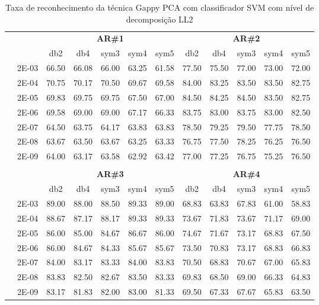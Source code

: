 \begin{table}[H]
	\centering
    \normalsize
	\caption{Taxa de reconhecimento da técnica Gappy PCA com classificador SVM com nível de decomposição LL2}
	\begin{tabular}{|c|c|c c c c c|c c c c c|}
\cline{3-12}
\multicolumn{2}{c|}{\multirow{2}{*}{}} & \multicolumn{5}{c|}{\textbf{AR\#1}}  & \multicolumn{5}{c|}{\textbf{AR\#2}} \\\cline{3-12}

\multicolumn{2}{c|}{}  & db2 & db4 & sym3 & sym4 & sym5 & db2 & db4& sym3 & sym4 & sym5 \\\hline
\multicolumn{1}{|c|}{ \multirow{6}{*}{\rotatebox[origin=c]{90}{\textbf{Gamma}}} }
&2E-03&	66.50&	66.08&	66.00&	63.25&	61.58&	77.50&	75.50&	77.00&	73.00&	72.00	\\\cline{2-12}
&2E-04&	70.75&	70.17&	70.50&	69.67&	69.58&	84.00&	83.25&	83.50&	83.50&	82.75	\\\cline{2-12}
&2E-05&	69.83&	69.75&	69.75&	67.50&	67.00&	84.50&	84.25&	84.50&	83.50&	82.75	\\\cline{2-12}
&2E-06&	69.58&	69.00&	69.00&	67.17&	66.33&	83.75&	83.00&	83.75&	83.00&	82.50	\\\cline{2-12}
&2E-07&	64.50&	63.75&	64.17&	63.83&	63.83&	78.50&	79.25&	79.50&	77.75&	78.50	\\\cline{2-12}
&2E-08&	63.67&	63.50&	63.67&	63.25&	63.33&	76.75&	77.50&	78.25&	76.25&	76.50	\\\cline{2-12}
&2E-09&	64.00&	63.17&	63.58&	62.92&	63.42&	77.00&	77.25&	76.75&	75.25&	76.50	
	
	


\\ \midrule
\multicolumn{12}{c}{}\\ 

\cline{3-12}
\multicolumn{2}{c}{} & \multicolumn{5}{|c|}{\textbf{AR\#3}}  & \multicolumn{5}{c|}{\textbf{AR\#4}} \\\cline{3-12}
\multicolumn{2}{c}{}  & \multicolumn{1}{|c}{db2} & db4 & sym3 & sym4 & sym5 & db2 & db4& sym3 & sym4 & sym5 \\\hline
\multicolumn{1}{|c|}{ \multirow{6}{*}{\rotatebox[origin=c]{90}{\textbf{Gamma}}} }
&2E-03&	89.00&	88.00&	88.50&	89.33&	89.00&	68.83&	63.83&	67.83&	61.00&	58.83	\\\cline{2-12}
&2E-04&	88.67&	87.17&	88.17&	89.33&	89.33&	73.67&	71.83&	73.67&	71.17&	69.00	\\\cline{2-12}
&2E-05&	86.00&	85.00&	84.67&	86.67&	86.00&	74.67&	71.67&	73.17&	68.83&	67.50	\\\cline{2-12}
&2E-06&	86.00&	84.67&	84.33&	85.67&	85.67&	73.50&	70.83&	73.17&	68.83&	66.83	\\\cline{2-12}
&2E-07&	84.00&	83.17&	83.33&	84.00&	83.83&	70.50&	68.83&	70.67&	67.00&	65.83	\\\cline{2-12}
&2E-08&	83.83&	82.50&	82.67&	83.50&	83.33&	69.83&	68.50&	69.00&	66.33&	64.83	\\\cline{2-12}
&2E-09&	83.17&	81.83&	82.00&	83.00&	81.33&	69.50&	67.33&	67.67&	65.83&	63.50	
	

\end{tabular}
\end{table}
